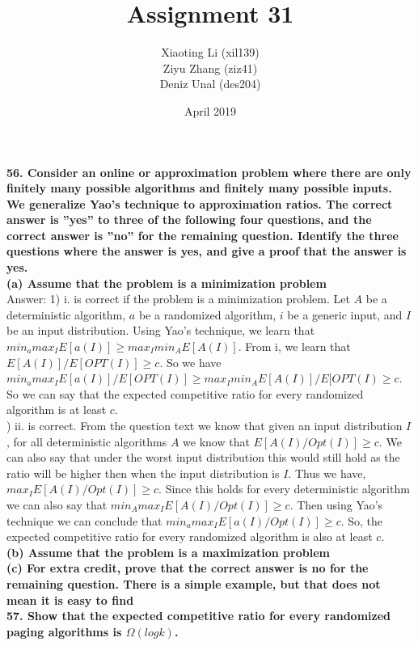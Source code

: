 \documentclass{article}
\title{Assignment 31}
\author{Xiaoting Li (xil139) \\
Ziyu Zhang (ziz41) \\
Deniz Unal (des204)}
\date{April 2019}
\begin{document}
\noindent
\textbf{56. Consider an online or approximation problem where there are only finitely many possible algorithms and finitely many possible inputs. We generalize Yao’s technique to approximation ratios. The correct answer is ”yes” to three of the following four questions, and the correct answer is ”no” for the remaining question. Identify the three questions where the answer is yes, and give a proof that the answer is yes.} \\ \newline
\textbf{(a) Assume that the problem is a minimization problem} \\ \newline
Answer: 1) i. is correct if the problem is a minimization problem. Let $A$ be a deterministic algorithm, $a$ be a randomized algorithm, $i$ be a generic input, and $I$ be an input distribution. Using Yao's technique, we learn that $min_a max_I E[a(I)] \geq max_I min_A E[A(I)]$. From i, we learn that $E[A(I)]/E[OPT(I)] \geq c$. So we have $min_a max_I E[a(I)]/E[OPT(I)] \geq max_I min_A E[A(I)]/E[OPT(I) \geq c$. So we can say that the expected competitive ratio for every randomized algorithm is at least $c$. \\ ) ii. is correct. From the question text we know that given an input distribution $I$, for all deterministic algorithms $A$ we know that $E[A(I) / Opt(I)] \geq c$. We can also say that under the worst input distribution this would still hold as the ratio will be higher then when the input distribution is $I$. Thus we have, $max_I E[A(I) / Opt(I)] \geq c$. Since this holds for every deterministic algorithm we can also say that $min_A max_I E[A(I) / Opt(I)] \geq c$. Then using Yao's technique we can conclude that $min_a max_I E[a(I) / Opt(I)] \geq c$. So, the expected competitive ratio for every randomized algorithm is also at least $c$. \\ \newline
\textbf{(b) Assume that the problem is a maximization problem} \\ \newline
\textbf{(c) For extra credit, prove that the correct answer is no for the remaining question. There is a simple example, but that does not mean it is easy to find} \\ \newline
\textbf{57. Show that the expected competitive ratio for every randomized paging algorithms is
$\Omega(logk)$.}
\end{document}
